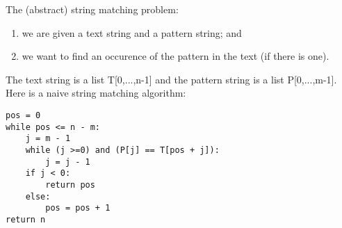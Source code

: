 The (abstract) string matching problem:

\begin{enumerate}
    \item we are given a text string and a pattern string; and
    \item we want to find an occurence of the pattern in the text (if there is one).
\end{enumerate}

The text string is a list T[0,...,n-1] and the pattern string is a list P[0,...,m-1]. Here is a naive string matching algorithm:

\begin{lstlisting}
pos = 0
while pos <= n - m:
    j = m - 1
    while (j >=0) and (P[j] == T[pos + j]):
        j = j - 1
    if j < 0:
        return pos
    else:
        pos = pos + 1
return n
\end{lstlisting}


